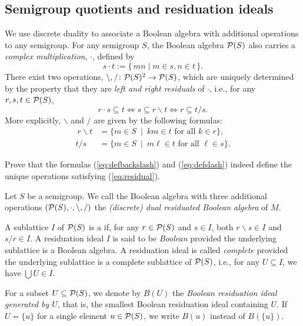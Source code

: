 \subsection*{Semigroup quotients and residuation ideals}

We use discrete duality to associate a Boolean algebra with additional operations to any semigroup. For any semigroup $S$, the Boolean algebra $\mathcal{P}(S)$ also carries a \emph{complex multiplication}, $\cdot$, defined by 
\[ s \cdot t := \{\,mn \mid  m \in s, n \in t\,\}.\]
There exist two operations, $\backslash, \slash \colon \mathcal{P}(S)^2 \to \mathcal{P}(S)$, which are uniquely determined by the property that they are \emph{left and right residuals} of $\cdot$, i.e., for any $r, s, t \in \mathcal{P}(S)$, 
\begin{equation}\label{eq:residual} r\cdot s \subseteq t \iff s \subseteq r \backslash t \iff r \subseteq t \slash s.
  \end{equation}
More explicitly, $\backslash$ and $\slash$ are given by the following formulas:
\begin{align}\
 r \backslash t &=\{m \in S \ \mid \ km \in t \text{ for all } k \in r\}, \label{eq:defbackslash}\\
 t \slash s &= \{m \in S \ \mid \ m\ell \in t \text{ for all } \ell \in s\}. \label{eq:defslash}
\end{align}
\begin{exercise}\easy
Prove that the formulas (\ref{eq:defbackslash}) and (\ref{eq:defslash}) indeed define the unique operations satisfying (\ref{eq:residual}).
\end{exercise}

\begin{definition}
Let $S$ be a semigroup. We call the Boolean algebra with three additional operations  $(\mathcal{P}(S), \cdot, \backslash, \slash)$ the \emph{(discrete) dual residuated Boolean algebra} of $M$.

A sublattice $I$ of $\mathcal{P}(S)$ is a  if, for any $r \in \mathcal{P}(S)$ and $s \in I$, both $r \backslash s \in I$ and $s \slash r \in I$. A residuation ideal $I$ is said to be \emph{Boolean} provided the underlying sublattice is a Boolean algebra. A residuation ideal is called \emph{complete} provided the underlying sublattice is a complete sublattice of $\mathcal{P}(S)$, i.e., for any $U \subseteq I$, we have $\bigcup U \in I$.

For a subset $U \subseteq \mathcal{P}(S)$, we denote by $B(U)$ the \emph{Boolean residuation ideal generated by $U$}, that is, the smallest Boolean residuation ideal containing $U$. If $U = \{u\}$ for a single element $u \in \mathcal{P}(S)$, we write $B(u)$ instead of $B(\{u\})$. 
\end{definition}

